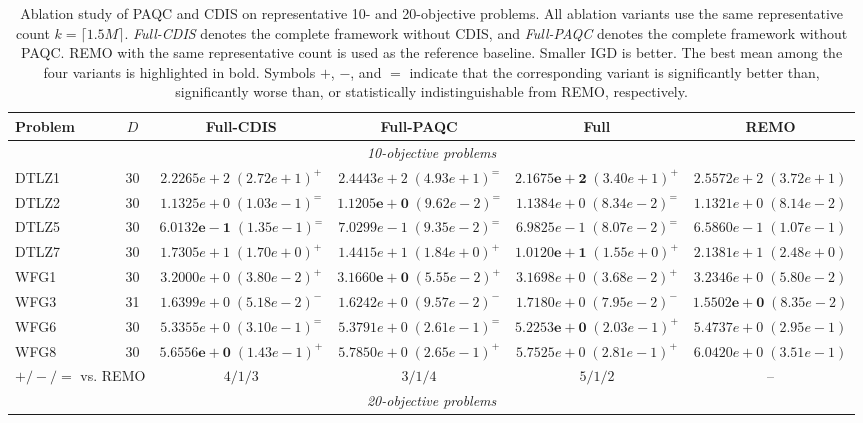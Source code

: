 \begin{table}[t]
\centering
\caption{Ablation study of PAQC and CDIS on representative 10- and 20-objective problems. All ablation variants use the same representative count $k=\lceil1.5M\rceil$. \textit{Full-CDIS} denotes the complete framework without CDIS, and \textit{Full-PAQC} denotes the complete framework without PAQC. REMO with the same representative count is used as the reference baseline. Smaller IGD is better. The best mean among the four variants is highlighted in bold. Symbols $+$, $-$, and $=$ indicate that the corresponding variant is significantly better than, significantly worse than, or statistically indistinguishable from REMO, respectively.}
\label{tab:exp:ablation}
\small
\setlength{\tabcolsep}{4pt}
\begin{tabular}{lccccc}
\toprule
Problem & $D$ & Full-CDIS & Full-PAQC & Full & REMO \\
\midrule
\multicolumn{6}{c}{\textit{10-objective problems}} \\
\midrule
DTLZ1 & 30 & $2.2265e+2\;(2.72e+1)^{+}$ & $2.4443e+2\;(4.93e+1)^{=}$ & $\mathbf{2.1675e+2}\;(3.40e+1)^{+}$ & $2.5572e+2\;(3.72e+1)$ \\
DTLZ2 & 30 & $1.1325e+0\;(1.03e-1)^{=}$ & $\mathbf{1.1205e+0}\;(9.62e-2)^{=}$ & $1.1384e+0\;(8.34e-2)^{=}$ & $1.1321e+0\;(8.14e-2)$ \\
DTLZ5 & 30 & $\mathbf{6.0132e-1}\;(1.35e-1)^{=}$ & $7.0299e-1\;(9.35e-2)^{=}$ & $6.9825e-1\;(8.07e-2)^{=}$ & $6.5860e-1\;(1.07e-1)$ \\
DTLZ7 & 30 & $1.7305e+1\;(1.70e+0)^{+}$ & $1.4415e+1\;(1.84e+0)^{+}$ & $\mathbf{1.0120e+1}\;(1.55e+0)^{+}$ & $2.1381e+1\;(2.48e+0)$ \\
WFG1 & 30 & $3.2000e+0\;(3.80e-2)^{+}$ & $\mathbf{3.1660e+0}\;(5.55e-2)^{+}$ & $3.1698e+0\;(3.68e-2)^{+}$ & $3.2346e+0\;(5.80e-2)$ \\
WFG3 & 31 & $1.6399e+0\;(5.18e-2)^{-}$ & $1.6242e+0\;(9.57e-2)^{-}$ & $1.7180e+0\;(7.95e-2)^{-}$ & $\mathbf{1.5502e+0}\;(8.35e-2)$ \\
WFG6 & 30 & $5.3355e+0\;(3.10e-1)^{=}$ & $5.3791e+0\;(2.61e-1)^{=}$ & $\mathbf{5.2253e+0}\;(2.03e-1)^{+}$ & $5.4737e+0\;(2.95e-1)$ \\
WFG8 & 30 & $\mathbf{5.6556e+0}\;(1.43e-1)^{+}$ & $5.7850e+0\;(2.65e-1)^{+}$ & $5.7525e+0\;(2.81e-1)^{+}$ & $6.0420e+0\;(3.51e-1)$ \\
\midrule
\multicolumn{2}{l}{$+/-/=$ vs. REMO} & $4/1/3$ & $3/1/4$ & $5/1/2$ & -- \\
\midrule
\multicolumn{6}{c}{\textit{20-objective problems}} \\

\end{tabular}
\end{table}
